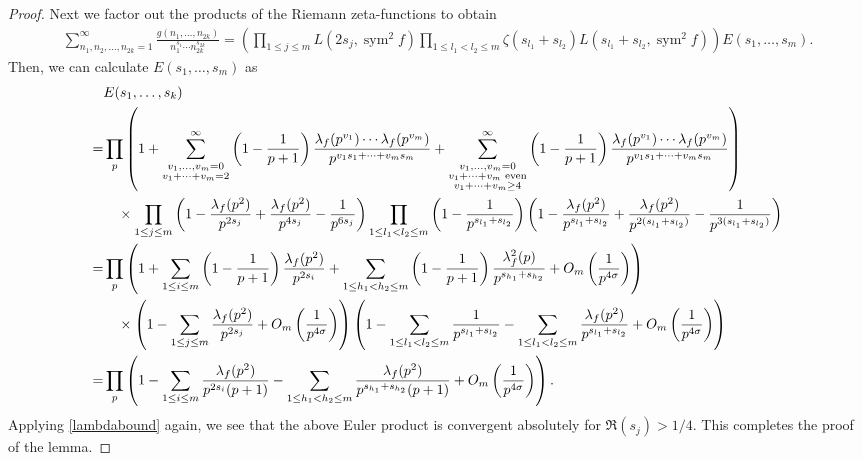 \documentclass[twoside,leqno,10pt, A4]{amsart}
\begin{document}
\begin{proof}
Next we factor out the products of the Riemann zeta-functions to obtain
\begin{align*}
\sum_{n_1, n_2, \ldots, n_{2k}=1}^{\infty} \frac{g(n_1, \ldots, n_{2k})}{n_1^{s_1} \cdots n_{2k}^{s_{2k}}} = \left( \prod_{1 \leq j \leq m} L(2s_j, \operatorname{sym}^2f ) \prod_{1 \leq l_1 < l_2 \leq m} \zeta(s_{l_1} + s_{l_2})L (s_{l_1} + s_{l_2},\operatorname{sym}^2f)\right) E(s_1, \ldots, s_{m}).
\end{align*}
Then, we can calculate \( E(s_1, \ldots, s_{m}) \) as
\begin{align*}
&E(s_1, \ldots, s_k) \\
= &\prod_p \left( 1 + \sum^{\infty}_{\begin{subarray}{c} v_1, \ldots, v_{m}=0 \\ v_1 + \cdots + v_{m} = 2 \end{subarray}} \left( 1 - \frac{1}{p+1} \right) \frac{\lambda_f(p^{v_1})\cdots \lambda_f(p^{v_m})}{p^{v_1 s_1 + \cdots + v_{m} s_{m}}}
+ \sum^{\infty}_{\substack{v_1, \dots, v_m = 0 \\ v_1 + \cdots + v_{m} \text{ even}\\v_1+\cdots+v_m\geq 4}} \left( 1 - \frac{1}{p+1} \right) \frac{\lambda_f(p^{v_1})\cdots \lambda_f(p^{v_m})}{p^{v_1 s_1 + \cdots + v_{m} s_{m}}}\right)\\
&\quad \times \prod_{1 \leq j \leq m} \left( 1 - \frac{\lambda_f(p^2)}{p^{2s_j}}+\frac{\lambda_f(p^2)}{p^{4s_j}}-\frac{1}{p^{6s_j}} \right) \prod_{1 \leq l_1 < l_2 \leq m} \left( 1 - \frac{1}{p^{s_{l_1} + s_{l_2}}} \right)\left( 1 - \frac{\lambda_f(p^2)}{p^{s_{l_1}+s_{l_2}}}+\frac{\lambda_f(p^2)}{p^{2(s_{l_1}+s_{l_2})}}-\frac{1}{p^{3(s_{l_1}+s_{l_2})}} \right)\\
=& \prod_p \left( 1 + \sum_{1 \leq i \leq m} \left( 1 - \frac{1}{p+1} \right) \frac{\lambda_f(p^2)}{p^{2s_i}} + \sum_{1 \leq h_1 < h_2 \leq m} \left( 1 - \frac{1}{p+1} \right) \frac{\lambda_f^2(p)}{p^{s_{h_1} + s_{h_2}}} + O_m \left( \frac{1}{p^{4\sigma}} \right) \right)\\
&\quad \times \left( 1 - \sum_{1 \leq j \leq m} \frac{\lambda_f(p^2)}{p^{2s_j}} + O_m \left( \frac{1}{p^{4\sigma}} \right) \right) \left( 1 - \sum_{1 \leq l_1 < l_2 \leq m} \frac{1}{p^{s_{l_1} + s_{l_2}}}- \sum_{1 \leq l_1 < l_2 \leq m} \frac{\lambda_f(p^2)}{p^{s_{l_1} + s_{l_2}}} + O_m \left( \frac{1}{p^{4\sigma}} \right) \right)\\
=& \prod_p \left( 1 -  \sum_{1 \leq i \leq m} \frac{\lambda_f(p^2)}{p^{2s_i}(p+1)} - \sum_{1 \leq h_1 < h_2 \leq m} \frac{\lambda_f(p^2)}{p^{s_{h_1} + s_{h_2} }(p+1)} + O_m \left( \frac{1}{p^{4\sigma}} \right) \right).
\end{align*}
Applying \eqref{lambdabound} again, we see that the above Euler product is convergent absolutely for \(\Re(s_j) > 1/4\). This completes the proof of the lemma.
\end{proof}
\end{document}

